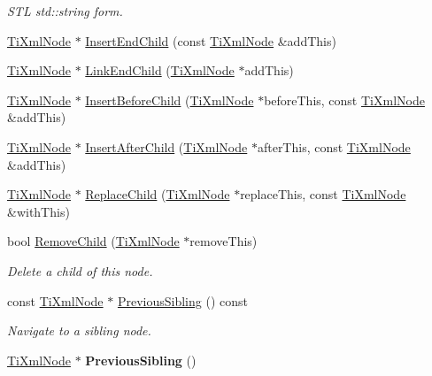\begin{DoxyCompactItemize}
\begin{DoxyCompactList}\small\item\em STL std::string form. \item\end{DoxyCompactList}\item 
\hyperlink{class_ti_xml_node}{TiXmlNode} $\ast$ \hyperlink{class_ti_xml_node_ad7d4630e1a2a916edda16be22448a8ba}{InsertEndChild} (const \hyperlink{class_ti_xml_node}{TiXmlNode} \&addThis)
\item 
\hyperlink{class_ti_xml_node}{TiXmlNode} $\ast$ \hyperlink{class_ti_xml_node_a5d29442ae46de6d0168429156197bfc6}{LinkEndChild} (\hyperlink{class_ti_xml_node}{TiXmlNode} $\ast$addThis)
\item 
\hyperlink{class_ti_xml_node}{TiXmlNode} $\ast$ \hyperlink{class_ti_xml_node_a0c146fa2fff0157b681594102f48cbc7}{InsertBeforeChild} (\hyperlink{class_ti_xml_node}{TiXmlNode} $\ast$beforeThis, const \hyperlink{class_ti_xml_node}{TiXmlNode} \&addThis)
\item 
\hyperlink{class_ti_xml_node}{TiXmlNode} $\ast$ \hyperlink{class_ti_xml_node_ad9b75e54ec19301c8b4d5ff583d0b3d5}{InsertAfterChild} (\hyperlink{class_ti_xml_node}{TiXmlNode} $\ast$afterThis, const \hyperlink{class_ti_xml_node}{TiXmlNode} \&addThis)
\item 
\hyperlink{class_ti_xml_node}{TiXmlNode} $\ast$ \hyperlink{class_ti_xml_node_a0c49e739a17b9938050c22cd89617fbd}{ReplaceChild} (\hyperlink{class_ti_xml_node}{TiXmlNode} $\ast$replaceThis, const \hyperlink{class_ti_xml_node}{TiXmlNode} \&withThis)
\item 
\hypertarget{class_ti_xml_node_ae19d8510efc90596552f4feeac9a8fbf}{
bool \hyperlink{class_ti_xml_node_ae19d8510efc90596552f4feeac9a8fbf}{RemoveChild} (\hyperlink{class_ti_xml_node}{TiXmlNode} $\ast$removeThis)}
\label{class_ti_xml_node_ae19d8510efc90596552f4feeac9a8fbf}

\begin{DoxyCompactList}\small\item\em Delete a child of this node. \item\end{DoxyCompactList}\item 
\hypertarget{class_ti_xml_node_ac2cd892768726270e511b2ab32de4d10}{
const \hyperlink{class_ti_xml_node}{TiXmlNode} $\ast$ \hyperlink{class_ti_xml_node_ac2cd892768726270e511b2ab32de4d10}{PreviousSibling} () const }
\label{class_ti_xml_node_ac2cd892768726270e511b2ab32de4d10}

\begin{DoxyCompactList}\small\item\em Navigate to a sibling node. \item\end{DoxyCompactList}\item 
\hypertarget{class_ti_xml_node_af8c0642ad6ecc03f62953e68896ed1cc}{
\hyperlink{class_ti_xml_node}{TiXmlNode} $\ast$ {\bfseries PreviousSibling} ()}
\label{class_ti_xml_node_af8c0642ad6ecc03f62953e68896ed1cc}


\end{DoxyCompactItemize}
